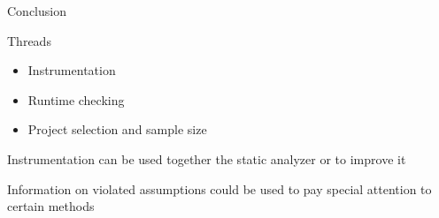 \begin{frame}{Conclusion}

\vspace*{-0.4cm}

Threads
\begin{itemize}
  \item Instrumentation
  \item Runtime checking
  \item Project selection and sample size
\end{itemize}

Instrumentation can be used together the static analyzer or to improve it

Information on violated assumptions could be used to pay special attention to
certain methods

\end{frame}